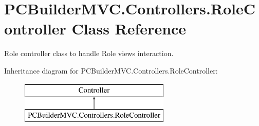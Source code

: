 \hypertarget{class_p_c_builder_m_v_c_1_1_controllers_1_1_role_controller}{}\section{P\+C\+Builder\+M\+V\+C.\+Controllers.\+Role\+Controller Class Reference}
\label{class_p_c_builder_m_v_c_1_1_controllers_1_1_role_controller}


Role controller class to handle Role views interaction.  


Inheritance diagram for P\+C\+Builder\+M\+V\+C.\+Controllers.\+Role\+Controller\+:\begin{figure}[H]
\begin{center}
\leavevmode
\includegraphics[height=2.000000cm]{class_p_c_builder_m_v_c_1_1_controllers_1_1_role_controller}
\end{center}
\end{figure}
